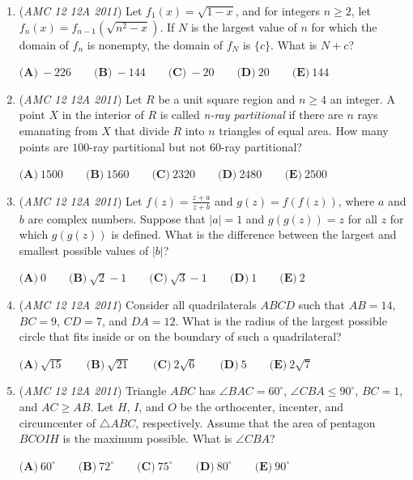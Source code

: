 \begin{enumerate}
 $\textbf{(A)}\ 1 \qquad \textbf{(B)}\ 2 \qquad \textbf{(C)}\ 3 \qquad \textbf{(D)}\ 4 \qquad \textbf{(E)}\ 5$


	\item (\textit{AMC 12 12A 2011}) Let $f_{1}(x)=\sqrt{1-x}$, and for integers $n \geq 2$, let $f_{n}(x)=f_{n-1}(\sqrt{n^2 - x})$. If $N$ is the largest value of $n$ for which the domain of $f_{n}$ is nonempty, the domain of $f_{N}$ is $\{ c\}$. What is $N+c$?


 $\textbf{(A)}\ -226 \qquad \textbf{(B)}\ -144 \qquad \textbf{(C)}\ -20 \qquad \textbf{(D)}\ 20 \qquad \textbf{(E)}\ 144$


	\item (\textit{AMC 12 12A 2011}) Let $R$ be a unit square region and $n \geq 4$ an integer. A point $X$ in the interior of $R$ is called \textit{n-ray partitional} if there are $n$ rays emanating from $X$ that divide $R$ into $n$ triangles of equal area. How many points are $100$-ray partitional but not $60$-ray partitional?


 $\textbf{(A)}\ 1500 \qquad \textbf{(B)}\ 1560 \qquad \textbf{(C)}\ 2320 \qquad \textbf{(D)}\ 2480 \qquad \textbf{(E)}\ 2500$


	\item (\textit{AMC 12 12A 2011}) Let $f(z)= \frac{z+a}{z+b}$ and $g(z)=f(f(z))$, where $a$ and $b$ are complex numbers. Suppose that $\left| a \right| = 1$ and $g(g(z))=z$ for all $z$ for which $g(g(z))$ is defined. What is the difference between the largest and smallest possible values of $\left| b \right|$?


 $\textbf{(A)}\ 0 \qquad \textbf{(B)}\ \sqrt{2}-1 \qquad \textbf{(C)}\ \sqrt{3}-1 \qquad \textbf{(D)}\ 1 \qquad \textbf{(E)}\ 2$


	\item (\textit{AMC 12 12A 2011}) Consider all quadrilaterals $ABCD$ such that $AB=14$, $BC=9$, $CD=7$, and $DA=12$. What is the radius of the largest possible circle that fits inside or on the boundary of such a quadrilateral?


 $\textbf{(A)}\ \sqrt{15} \qquad \textbf{(B)}\ \sqrt{21} \qquad \textbf{(C)}\ 2\sqrt{6} \qquad \textbf{(D)}\ 5 \qquad \textbf{(E)}\ 2\sqrt{7}$


	\item (\textit{AMC 12 12A 2011}) Triangle $ABC$ has $\angle BAC = 60^{\circ}$, $\angle CBA \leq 90^{\circ}$, $BC=1$, and $AC \geq AB$. Let $H$, $I$, and $O$ be the orthocenter, incenter, and circumcenter of $\triangle ABC$, respectively. Assume that the area of pentagon $BCOIH$ is the maximum possible. What is $\angle CBA$?


 $\textbf{(A)}\ 60^{\circ} \qquad \textbf{(B)}\ 72^{\circ} \qquad \textbf{(C)}\ 75^{\circ} \qquad \textbf{(D)}\ 80^{\circ} \qquad \textbf{(E)}\ 90^{\circ}$


\end{enumerate}